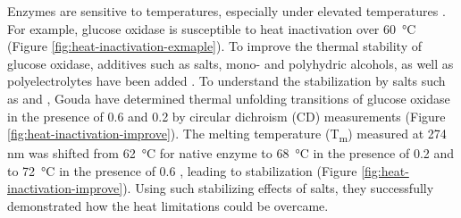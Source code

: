 \begin{refsection}
Enzymes are sensitive to temperatures, especially under elevated temperatures
\cite{Perdana2012,Etzel1996}. For example, glucose oxidase \cite{Gouda2003} is
susceptible to heat inactivation over \SI{60}{\celsius} \cite{Gouda2003} (Figure
\ref{fig:heat-inactivation-exmaple}). To improve the thermal stability of
glucose oxidase, additives such as salts, mono- and polyhydric alcohols, as
well as polyelectrolytes have been added \cite{Appleton1997,Gouda2003}. To
understand the stabilization by salts such as  and , Gouda
 have determined thermal unfolding transitions of glucose oxidase in
the presence of \SI{0.6}{\Molar}  and \SI{0.2}{\Molar}  by
circular dichroism (CD) measurements \cite{Gouda2003} (Figure
\ref{fig:heat-inactivation-improve}). The melting temperature
(T\textsubscript{m}) measured at 274 nm was shifted from \SI{62}{\celsius} for
native enzyme to \SI{68}{\celsius} in the presence of \SI{0.2}{\Molar}
 and to \SI{72}{\celsius} in the presence of \SI{0.6}{\Molar}
, leading to stabilization (Figure
\ref{fig:heat-inactivation-improve}). Using such stabilizing effects of salts,
they successfully demonstrated how the heat limitations could be overcame. 


\end{refsection}
